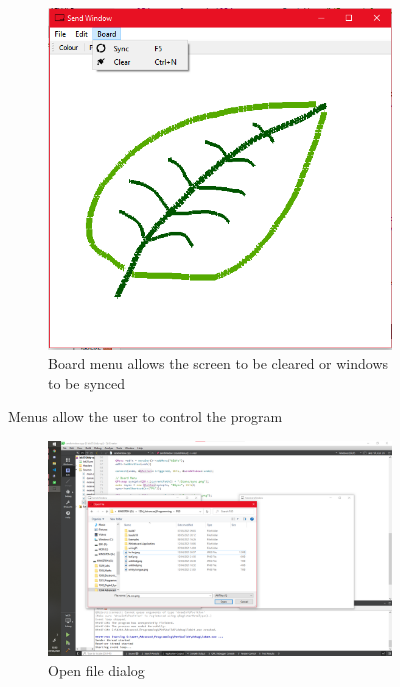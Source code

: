 \documentclass[10pt]{article}
\newcommand{\figsquish}{\vspace{-5mm}} %
\begin{document}
\begin{multicols*}{2}
\begin{figure}[H]
\begin{subfigure}[t]{0.32\columnwidth}
		\includegraphics[width=\columnwidth]{./board.png}
		\caption{Board menu allows the screen to be cleared or windows to be synced}
		\label{fig:board}
	\end{subfigure}
	\caption{Menus allow the user to control the program}
	\label{fig:menus}
\end{figure}
\figsquish

\begin{figure}[H]
	\centering
	\begin{subfigure}[t]{0.48\columnwidth}

		\includegraphics[width=\columnwidth]{./open.png}
		\caption{Open file dialog}
		\label{fig:open}
	\end{subfigure}
	\hfill
	\begin{subfigure}[t]{0.48\columnwidth}


\end{subfigure}
\end{figure}
\end{multicols*}
\end{document}
